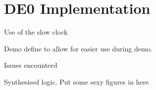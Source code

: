 
\section{DE0 Implementation}

Use of the slow clock

Demo define to allow for easier use during demo.

Issues encounterd

Synthesised logic. Put some sexy figures in here

